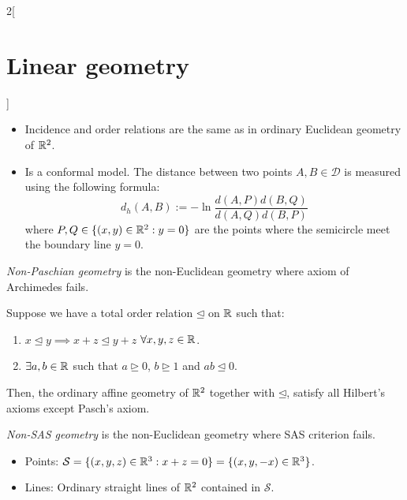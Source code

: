 \documentclass[../../../main.tex]{subfiles}
\begin{document}
\begin{multicols}{2}[\section{Linear geometry}]
\begin{definition}
\begin{itemize}
\begin{itemize}
              \item Incidence and order relations are the same as in ordinary Euclidean geometry of $\mathbb{R}^2$.
              \item Is a conformal model. The distance between two points $A,B\in\mathcal{D}$ is measured using the following formula: $$d_h(A,B):=-\ln\frac{d(A,P)d(B,Q)}{d(A,Q)d(B,P)}$$ where $P,Q\in\{(x,y)\in\mathbb{R}^2:y=0\}$ are the points where the semicircle meet the boundary line $y=0$.
            \end{itemize}
            \begin{center}
              \begin{minipage}{\linewidth}
                \centering
                
              \end{minipage}
            \end{center}
    \end{itemize}
  \end{definition}
  \begin{definition}
    \emph{Non-Paschian geometry} is the non-Euclidean geometry where axiom of Archimedes fails.
  \end{definition}
  \begin{proposition}
    Suppose we have a total order relation $\unlhd$ on $\mathbb{R} $ such that:
    \begin{enumerate}
      \item $x\unlhd y\implies x+z\unlhd y+z$ $\forall x,y,z\in\mathbb{R} $.
      \item $\exists a,b\in\mathbb{R}$ such that $a\unrhd 0$, $b\unrhd 1$ and $ab\unlhd 0$.
    \end{enumerate}
    Then, the ordinary affine geometry of $\mathbb{R}^2$ together with $\unlhd$, satisfy all Hilbert's axioms except Pasch's axiom.
  \end{proposition}
  \begin{definition}
    \emph{Non-SAS geometry} is the non-Euclidean geometry where SAS criterion fails.
  \end{definition}
  \begin{proposition}
    \hfill
    \begin{itemize}
      \item Points: $\mathcal{S}=\{(x,y,z)\in\mathbb{R}^3:x+z=0\}=\{(x,y,-x)\in\mathbb{R}^3\}$.
      \item Lines: Ordinary straight lines of $\mathbb{R}^2$ contained in $\mathcal{S}$.

\end{itemize}
\end{proposition}
\end{multicols}
\end{document}
